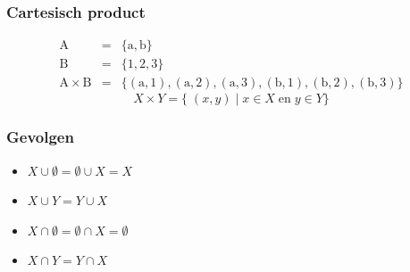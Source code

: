 \documentclass[dutch]{beamer}
\newcommand{\union}{\cup}
\newcommand{\intersect}{\cap}
\begin{document}
\begin{frame}
  \frametitle{Cartesisch product}
  \[
    \begin{array}{rcl}
      \mathrm{A} & = & \{ \mathrm{a}, \mathrm{b} \} \\
      \mathrm{B} & = & \{ 1, 2, 3 \} \\
      \mathrm{A} \times \mathrm{B} & = & \{ ( \mathrm{a}, 1 ), (\mathrm{a}, 2 ), (\mathrm{a}, 3 ), ( \mathrm{b}, 1 ), (\mathrm{b}, 2 ), (\mathrm{b}, 3 ) \}
    \end{array}
  \]
  \vskip5mm
  \[
    X \times Y = \{ \; (x, y) \;|\; x \in X \;\mathrm{en}\; y \in Y \}
  \]
\end{frame}

\begin{frame}
  \frametitle{Gevolgen}
  \begin{itemize}
    \item $X \union \emptyset = \emptyset \union X = X$
    \item $X \union Y = Y \union X$
    \item $X \intersect \emptyset = \emptyset \intersect X = \emptyset$
    \item $X \intersect Y = Y \intersect X$

  \end{itemize}
\end{frame}


\end{document}
